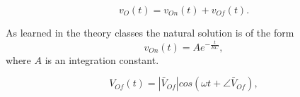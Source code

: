 \begin{equation}
  v_O(t) = v_{On}(t) + v_{Of}(t).
  \label{eq:vo_sol}
\end{equation}

As learned in the theory classes the natural solution is of the form
\begin{equation}
  v_{On}(t) = Ae^{-\frac{t}{RC}},
  \label{eq:vo_nat}
\end{equation}
where $A$ is an integration constant.

\begin{equation}
  V_{Of}(t) = |\bar{V}_{Of}| cos(\omega t + \angle \bar{V}_{Of}),
  \label{eq:vo_for}
\end{equation}


